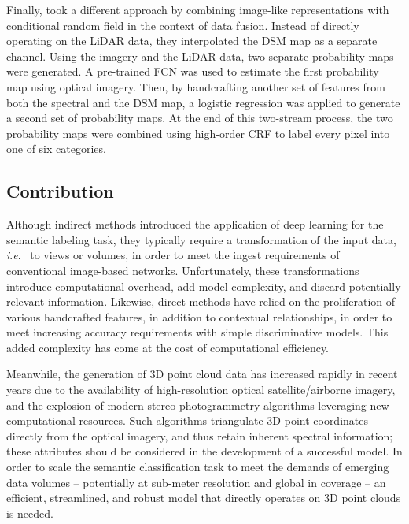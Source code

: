 \documentclass[final,3p,times,twocolumn,authoryear]{elsarticle}
\newcommand{\ie}{\textit{i}.\textit{e}.}
\begin{document}
Finally,  took a different approach by combining image-like representations with conditional random field in the context of data fusion. Instead of directly operating on the LiDAR data, they interpolated the DSM map as a separate channel. 
Using the imagery and the LiDAR data, two separate probability maps were generated. 
A pre-trained FCN was used to estimate the first probability map using optical imagery. 
Then, by handcrafting another set of features from both the spectral and the DSM map, a logistic regression was applied to generate a second set of probability maps. 
At the end of this two-stream process, the two probability maps were combined using high-order CRF to label every pixel into one of six categories.

\subsection{Contribution}
\label{sec:contribution}
Although indirect methods introduced the application of deep learning for the semantic labeling task, they typically require a transformation of the input data, \ie~ to views or volumes, in order to meet the ingest requirements of conventional image-based networks. 
Unfortunately, these transformations introduce computational overhead, add model complexity, and discard potentially relevant information.
Likewise, direct methods have relied on the proliferation of various handcrafted features, in addition to contextual relationships, in order to meet increasing accuracy requirements with simple discriminative models. 
This added complexity has come at the cost of computational efficiency. 

Meanwhile, the generation of 3D point cloud data has increased rapidly in recent years due to the availability of high-resolution optical satellite/airborne imagery, and the explosion of modern stereo photogrammetry algorithms leveraging new computational resources. 
Such algorithms triangulate 3D-point coordinates directly from the optical imagery, and thus retain inherent spectral information; these  attributes should be considered in the development of a successful model.
In order to scale the semantic classification task to meet the demands of emerging data volumes -- potentially at sub-meter resolution and global in coverage -- an efficient, streamlined, and robust model that directly operates on 3D point clouds is needed. 
\end{document}
